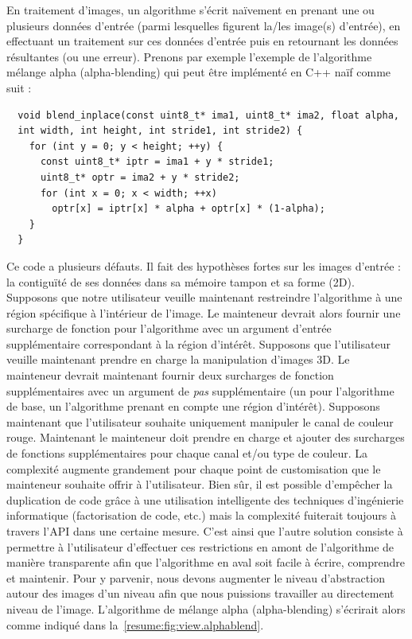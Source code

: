 En traitement d'images, un algorithme s'écrit naïvement en prenant une ou plusieurs données d'entrée (parmi lesquelles
figurent la/les image(s) d'entrée), en effectuant un traitement sur ces données d'entrée puis en retournant les données
résultantes (ou une erreur). Prenons par exemple l'exemple de l'algorithme mélange alpha (alpha-blending) qui peut être
implémenté en C++ naïf comme suit :
\begin{verbatim}
  void blend_inplace(const uint8_t* ima1, uint8_t* ima2, float alpha,
  int width, int height, int stride1, int stride2) {
    for (int y = 0; y < height; ++y) {
      const uint8_t* iptr = ima1 + y * stride1;
      uint8_t* optr = ima2 + y * stride2;
      for (int x = 0; x < width; ++x)
        optr[x] = iptr[x] * alpha + optr[x] * (1-alpha);
    }
  }
\end{verbatim}

Ce code a plusieurs défauts. Il fait des hypothèses fortes sur les images d'entrée : la contiguïté de ses données dans
sa mémoire tampon et sa forme (2D). Supposons que notre utilisateur veuille maintenant restreindre l'algorithme à une
région spécifique à l'intérieur de l'image. Le mainteneur devrait alors fournir une surcharge de fonction pour
l'algorithme avec un argument d'entrée supplémentaire correspondant à la région d'intérêt. Supposons que l'utilisateur
veuille maintenant prendre en charge la manipulation d'images 3D. Le mainteneur devrait maintenant fournir deux
surcharges de fonction supplémentaires avec un argument de \emph{pas} supplémentaire (un pour l'algorithme de base, un
l'algorithme prenant en compte une région d'intérêt). Supposons maintenant que l'utilisateur souhaite uniquement
manipuler le canal de couleur rouge. Maintenant le mainteneur doit prendre en charge et ajouter des surcharges de
fonctions supplémentaires pour chaque canal et/ou type de couleur. La complexité augmente grandement pour chaque point
de customisation que le mainteneur souhaite offrir à l'utilisateur. Bien sûr, il est possible d'empêcher la duplication
de code grâce à une utilisation intelligente des techniques d'ingénierie informatique (factorisation de code, etc.) mais
la complexité fuiterait toujours à travers l'API dans une certaine mesure. C'est ainsi que l'autre solution consiste à
permettre à l'utilisateur d'effectuer ces restrictions en amont de l'algorithme de manière transparente afin que
l'algorithme en aval soit facile à écrire, comprendre et maintenir. Pour y parvenir, nous devons augmenter le niveau
d'abstraction autour des images d'un niveau afin que nous puissions travailler au directement niveau de l'image.
L'algorithme de mélange alpha (alpha-blending) s'écrirait alors comme indiqué dans la~\cref{resume:fig:view.alphablend}.

